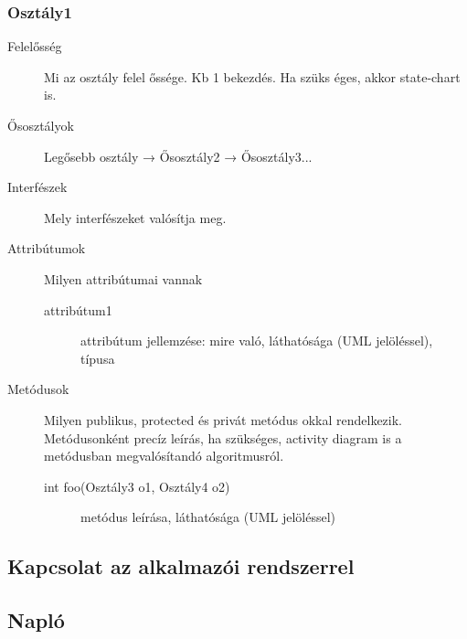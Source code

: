 		\subsubsection{Osztály1}
			\begin{description}
				\item[Felelősség] Mi az osztály felel őssége. Kb 1 bekezdés. Ha szüks éges, akkor state-chart is.
				\item[Ősosztályok] Legősebb osztály → Ősosztály2  → Ősosztály3...
				\item[Interfészek] Mely interfészeket valósítja meg.
				\item[Attribútumok] Milyen attribútumai vannak
					\begin{description}
						\item[attribútum1] attribútum jellemzése: mire való, láthatósága (UML jelöléssel), típusa 
					\end{description}
				\item[Metódusok] Milyen publikus, protected és privát  metódus okkal rendelkezik. Metódusonként precíz leírás, 
ha szükséges, activity diagram is  a metódusban megvalósítandó algoritmusról.
					\begin{description}
						\item[int foo(Osztály3 o1, Osztály4 o2)] metódus leírása, láthatósága (UML jelöléssel)
					\end{description}
			\end{description}

	\subsection{Kapcsolat az alkalmazói rendszerrel}
	
		\subsection{Napló}
	

